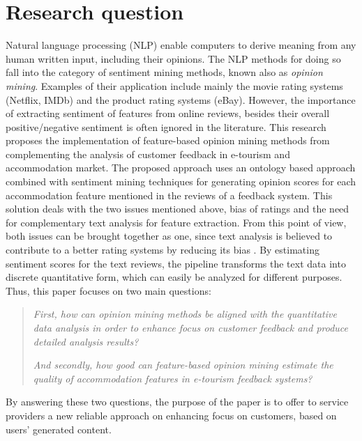 \section{Research question}
Natural language processing (NLP) enable computers to derive meaning from any human written input, including their opinions. The NLP methods for doing so fall into the category of sentiment mining methods, known also as \textit{opinion mining}. Examples of their application include mainly the movie rating systems (Netflix, IMDb) and the product rating systems (eBay). However, the importance of extracting sentiment of features from online reviews, besides their overall positive/negative sentiment is often ignored in the literature. This research proposes the implementation of feature-based opinion mining methods from complementing the analysis of customer feedback in e-tourism and accommodation market. The proposed approach uses an ontology based approach combined with sentiment mining techniques for generating opinion scores for each accommodation feature mentioned in the reviews of a feedback system. This solution deals with the two issues mentioned above, bias of ratings and the need for complementary text analysis for feature extraction. From this point of view, both issues can be brought together as one, since text analysis is believed to contribute to a better rating systems by reducing its bias \cite{fradkin2016bias}. By estimating sentiment scores for the text reviews, the pipeline transforms the text data into discrete quantitative form, which can easily be analyzed for different purposes. Thus, this paper focuses on two main questions:
\begin{quote} \textit{First, how can opinion mining methods be aligned with the quantitative data analysis in order to enhance focus on customer feedback and produce detailed analysis results?}

 \textit{And secondly, how good can feature-based opinion mining estimate the quality of accommodation features in e-tourism feedback systems?}
\end{quote}
By answering these two questions, the purpose of the paper is to offer to service providers a new reliable approach on enhancing focus on customers, based on users' generated content.

